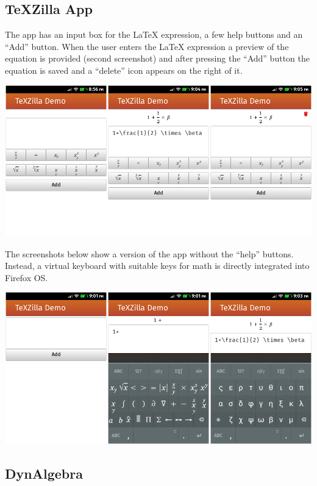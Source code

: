 \subsection{TeXZilla App}

The app has an input box for the LaTeX expression, a few help buttons and an
``Add'' button. When the user enters the LaTeX expression a preview of the
equation is provided (second screenshot) and after pressing the ``Add'' button
the equation is saved and a ``delete'' icon appears on the right of it.

\href{http://r-gaia-cs.github.io/TeXZilla-webapp/}{\includegraphics[width=\textwidth]{screenshots/9-texzilla-app-A.png}}

The screenshots below show a version of the app without the ``help'' buttons.
Instead, a virtual keyboard with suitable keys for math is directly integrated
into Firefox OS.

\href{http://r-gaia-cs.github.io/TeXZilla-webapp/}{\includegraphics[width=\textwidth]{screenshots/9-texzilla-app-B.png}}

\subsection{DynAlgebra}

